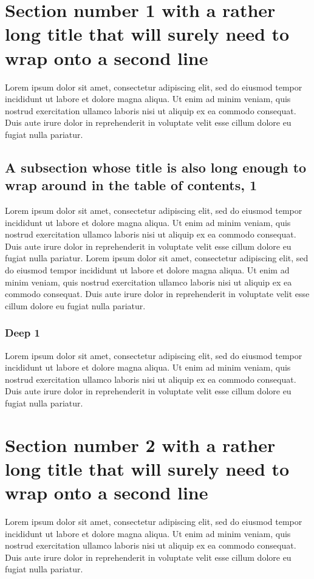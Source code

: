 \documentclass[11pt]{article}
\begin{document}
\tableofcontents
\section{Section number 1 with a rather long title that will surely need to wrap onto a second line}
Lorem ipsum dolor sit amet, consectetur adipiscing elit, sed do eiusmod tempor incididunt ut labore et dolore magna aliqua. Ut enim ad minim veniam, quis nostrud exercitation ullamco laboris nisi ut aliquip ex ea commodo consequat. Duis aute irure dolor in reprehenderit in voluptate velit esse cillum dolore eu fugiat nulla pariatur.

\subsection{A subsection whose title is also long enough to wrap around in the table of contents, 1}
Lorem ipsum dolor sit amet, consectetur adipiscing elit, sed do eiusmod tempor incididunt ut labore et dolore magna aliqua. Ut enim ad minim veniam, quis nostrud exercitation ullamco laboris nisi ut aliquip ex ea commodo consequat. Duis aute irure dolor in reprehenderit in voluptate velit esse cillum dolore eu fugiat nulla pariatur. Lorem ipsum dolor sit amet, consectetur adipiscing elit, sed do eiusmod tempor incididunt ut labore et dolore magna aliqua. Ut enim ad minim veniam, quis nostrud exercitation ullamco laboris nisi ut aliquip ex ea commodo consequat. Duis aute irure dolor in reprehenderit in voluptate velit esse cillum dolore eu fugiat nulla pariatur.

\subsubsection{Deep 1}
Lorem ipsum dolor sit amet, consectetur adipiscing elit, sed do eiusmod tempor incididunt ut labore et dolore magna aliqua. Ut enim ad minim veniam, quis nostrud exercitation ullamco laboris nisi ut aliquip ex ea commodo consequat. Duis aute irure dolor in reprehenderit in voluptate velit esse cillum dolore eu fugiat nulla pariatur.

\section{Section number 2 with a rather long title that will surely need to wrap onto a second line}
Lorem ipsum dolor sit amet, consectetur adipiscing elit, sed do eiusmod tempor incididunt ut labore et dolore magna aliqua. Ut enim ad minim veniam, quis nostrud exercitation ullamco laboris nisi ut aliquip ex ea commodo consequat. Duis aute irure dolor in reprehenderit in voluptate velit esse cillum dolore eu fugiat nulla pariatur.
\end{document}
